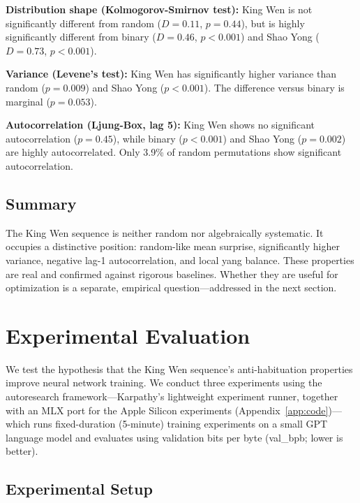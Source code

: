\documentclass{article}
\begin{document}
\textbf{Distribution shape (Kolmogorov-Smirnov test):} King Wen is not significantly different from random ($D = 0.11$, $p = 0.44$), but is highly significantly different from binary ($D = 0.46$, $p < 0.001$) and Shao Yong ($D = 0.73$, $p < 0.001$).

\textbf{Variance (Levene's test):} King Wen has significantly higher variance than random ($p = 0.009$) and Shao Yong ($p < 0.001$). The difference versus binary is marginal ($p = 0.053$).

\textbf{Autocorrelation (Ljung-Box, lag 5):} King Wen shows no significant autocorrelation ($p = 0.45$), while binary ($p < 0.001$) and Shao Yong ($p = 0.002$) are highly autocorrelated. Only 3.9\% of random permutations show significant autocorrelation.

\subsection{Summary}

The King Wen sequence is neither random nor algebraically systematic. It occupies a distinctive position: random-like mean surprise, significantly higher variance, negative lag-1 autocorrelation, and local yang balance. These properties are real and confirmed against rigorous baselines. Whether they are useful for optimization is a separate, empirical question---addressed in the next section.

\section{Experimental Evaluation}\label{sec:experiments}

We test the hypothesis that the King Wen sequence's anti-habituation properties improve neural network training. We conduct three experiments using the autoresearch framework---Karpathy's lightweight experiment runner, together with an MLX port for the Apple Silicon experiments (Appendix~\ref{app:code})---which runs fixed-duration (5-minute) training experiments on a small GPT language model and evaluates using validation bits per byte (val\_bpb; lower is better).

\subsection{Experimental Setup}
\end{document}

